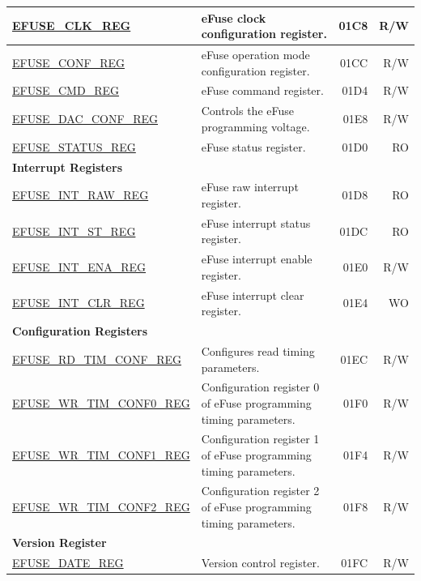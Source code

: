 \begin{longtable}{ | m{6cm} | m{7.2cm} | r| r | }
\hyperref[regdesc:EFUSECLKREG]{EFUSE\_CLK\_REG} & eFuse clock configuration register. & \hexprefix{}01C8 & R/W \\ \hline
\hyperref[regdesc:EFUSECONFREG]{EFUSE\_CONF\_REG} & eFuse operation mode configuration register. & \hexprefix{}01CC & R/W \\ \hline
\hyperref[regdesc:EFUSECMDREG]{EFUSE\_CMD\_REG} & eFuse command register. & \hexprefix{}01D4 & R/W \\ \hline
\hyperref[regdesc:EFUSEDACCONFREG]{EFUSE\_DAC\_CONF\_REG} & Controls the eFuse programming voltage. & \hexprefix{}01E8 & R/W \\ \hline
\hyperref[regdesc:EFUSESTATUSREG]{EFUSE\_STATUS\_REG} & eFuse status register. & \hexprefix{}01D0 & RO \\ \hline
\multicolumn{4}{|l|}{\textbf{Interrupt Registers}} \\ \hline
\hyperref[regdesc:EFUSEINTRAWREG]{EFUSE\_INT\_RAW\_REG} & eFuse raw interrupt register. & \hexprefix{}01D8 & RO \\ \hline
\hyperref[regdesc:EFUSEINTSTREG]{EFUSE\_INT\_ST\_REG} & eFuse interrupt status register. & \hexprefix{}01DC & RO \\ \hline
\hyperref[regdesc:EFUSEINTENAREG]{EFUSE\_INT\_ENA\_REG} & eFuse interrupt enable register. & \hexprefix{}01E0 & R/W \\ \hline
\hyperref[regdesc:EFUSEINTCLRREG]{EFUSE\_INT\_CLR\_REG} & eFuse interrupt clear register. & \hexprefix{}01E4 & WO \\ \hline
\multicolumn{4}{|l|}{\textbf{Configuration Registers}} \\ \hline
\hyperref[regdesc:EFUSERDTIMCONFREG]{EFUSE\_RD\_TIM\_CONF\_REG} & Configures read timing parameters. & \hexprefix{}01EC & R/W \\ \hline
\hyperref[regdesc:EFUSEWRTIMCONF0REG]{EFUSE\_WR\_TIM\_CONF0\_REG} & Configuration register 0 of eFuse programming timing parameters. & \hexprefix{}01F0 & R/W \\ \hline
\hyperref[regdesc:EFUSEWRTIMCONF1REG]{EFUSE\_WR\_TIM\_CONF1\_REG} & Configuration register 1 of eFuse programming timing parameters. & \hexprefix{}01F4 & R/W \\ \hline
\hyperref[regdesc:EFUSEWRTIMCONF2REG]{EFUSE\_WR\_TIM\_CONF2\_REG} & Configuration register 2 of eFuse programming timing parameters. & \hexprefix{}01F8 & R/W \\ \hline
\multicolumn{4}{|l|}{\textbf{Version Register}} \\ \hline
\hyperref[regdesc:EFUSEDATEREG]{EFUSE\_DATE\_REG} & Version control register. & \hexprefix{}01FC & R/W \\ \hline
\end{longtable}
